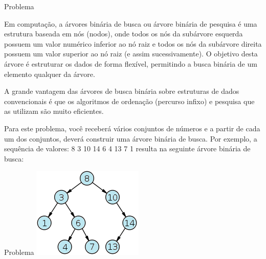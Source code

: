 
\begin{frame}[fragile]{Problema}

Em computação, a árvores binária de busca ou árvore binária de pesquisa é uma estrutura baseada em nós (nodos), onde todos os nós da subárvore esquerda possuem um valor numérico inferior ao nó raiz e todos os nós da subárvore direita possuem um valor superior ao nó raiz (e assim sucessivamente). O objetivo desta árvore é estruturar os dados de forma flexível, permitindo a busca binária de um elemento qualquer da árvore.

A grande vantagem das árvores de busca binária sobre estruturas de dados convencionais é que os algoritmos de ordenação (percurso infixo) e pesquisa que as utilizam são muito eficientes.

Para este problema, você receberá vários conjuntos de números e a partir de cada um dos conjuntos, deverá construir uma árvore binária de busca. Por exemplo, a sequência de valores: 8 3 10 14 6 4 13 7 1 resulta na seguinte árvore binária de busca:

\end{frame}


\begin{frame}[fragile]{Problema}
    \includegraphics[scale=1,center]{figures/UOJ_1195.png}
\end{frame}

